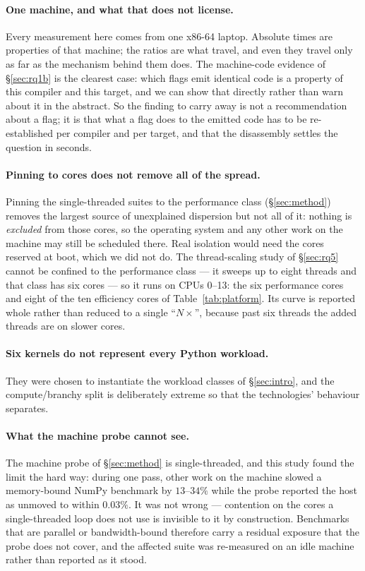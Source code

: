 \documentclass[10pt,a4paper]{article}
\begin{document}
\paragraph{One machine, and what that does not license.} Every measurement here comes from one
x86-64 laptop. Absolute times are properties of that machine; the ratios are what travel, and
even they travel only as far as the mechanism behind them does. The machine-code evidence of
\S\ref{sec:rq1b} is the clearest case: which flags emit identical code is a property of this
compiler and this target, and we can show that directly rather than warn about it in the
abstract. So the finding to carry away is not a recommendation about a flag; it is that what a
flag does to the emitted code has to be re-established per compiler and per target, and that
the disassembly settles the question in seconds.

\paragraph{Pinning to cores does not remove all of the spread.} Pinning the single-threaded suites to
the performance class (\S\ref{sec:method}) removes the largest source of unexplained dispersion
but not all of it: nothing is \emph{excluded} from those cores, so the operating system and any
other work on the machine may still be scheduled there. Real isolation would need the cores
reserved at boot, which we did not do. The thread-scaling study of \S\ref{sec:rq5} cannot be
confined to the performance class --- it sweeps up to eight threads and that class has six cores
--- so it runs on CPUs 0--13: the six performance cores and eight of the ten efficiency cores of
Table~\ref{tab:platform}. Its curve is reported whole rather than reduced to a
single
``$N\times$'', because past six threads the added threads are on slower cores.

\paragraph{Six kernels do not represent every Python workload.} They were
chosen to instantiate the workload classes of \S\ref{sec:intro}, and the
compute/branchy split is deliberately extreme so that the technologies' behaviour
separates.

\paragraph{What the machine probe cannot see.} The machine probe of \S\ref{sec:method} is
single-threaded, and this study found the limit the hard
way: during one pass, other work on the machine slowed a memory-bound NumPy benchmark by
$13$--$34\%$ while the probe reported the host as unmoved to within $0.03\%$. It was not
wrong --- contention on the cores a single-threaded loop does not use is invisible to it by
construction. Benchmarks that are parallel or bandwidth-bound therefore carry a residual
exposure that the probe does not cover, and the affected suite was re-measured on an idle
machine rather than reported as it stood.
\end{document}

